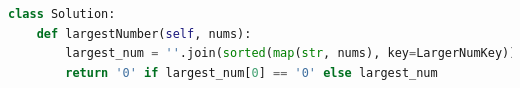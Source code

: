 \documentclass[../main.tex]{subfiles}
\begin{document}
\begin{enumerate}
\begin{lstlisting}[language = Python]
class Solution:
    def largestNumber(self, nums):
        largest_num = ''.join(sorted(map(str, nums), key=LargerNumKey))
        return '0' if largest_num[0] == '0' else largest_num
\end{lstlisting}
\end{enumerate}
\end{document}
